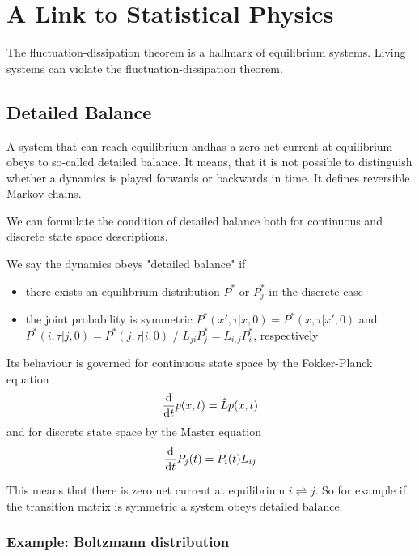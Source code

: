 \documentclass{/home/ben/Templates/notebook}
\begin{document}
	\chapter{A Link to Statistical Physics}
	
	The fluctuation-dissipation theorem is a hallmark of equilibrium systems. Living systems can violate the fluctuation-dissipation theorem. 
	
	\section{Detailed Balance}
	
	A system that can reach equilibrium andhas a zero net current at equilibrium obeys to so-called detailed balance. It means, that it is not possible to distinguish whether a dynamics is played forwards or backwards in time. It defines reversible Markov chains.
	
	We can formulate the condition of detailed balance both for continuous and discrete state space descriptions.
	
	\begin{theorem}
		We say the dynamics obeys "detailed balance" if
		\begin{itemize}
			\item{there exists an equilibrium distribution $P^*$ or $P_j^*$ in the discrete case}
			\item{the joint probability is symmetric $P^*(x', \tau | x, 0) = P^*(x, \tau | x', 0)$ and $P^*(i, \tau | j, 0) = P^*(j, \tau | i, 0)$ / $L_{ji} P_j^* = L_{i,j} P_i^*$, respectively}
		\end{itemize}
		Its behaviour is governed for continuous state space by the Fokker-Planck equation
		\begin{equation}
		\dv{t} p(x,t) = \hat{L} p(x,t)
		\end{equation}
		and for discrete state space by the Master equation
		\begin{equation}
		\dv{t} P_j(t) = P_i(t) L_{ij}
		\end{equation}
	\end{theorem}
	
	This means that there is zero net current at equilibrium $i \rightleftharpoons j$. So for example if the transition matrix is symmetric a system obeys detailed balance.
	
	\subsection*{Example: Boltzmann distribution}
	
\end{document}
